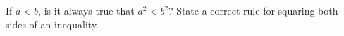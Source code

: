 If $a<b$, is it always true that $a^2<b^2$? State a correct rule for squaring both sides of an inequality.
